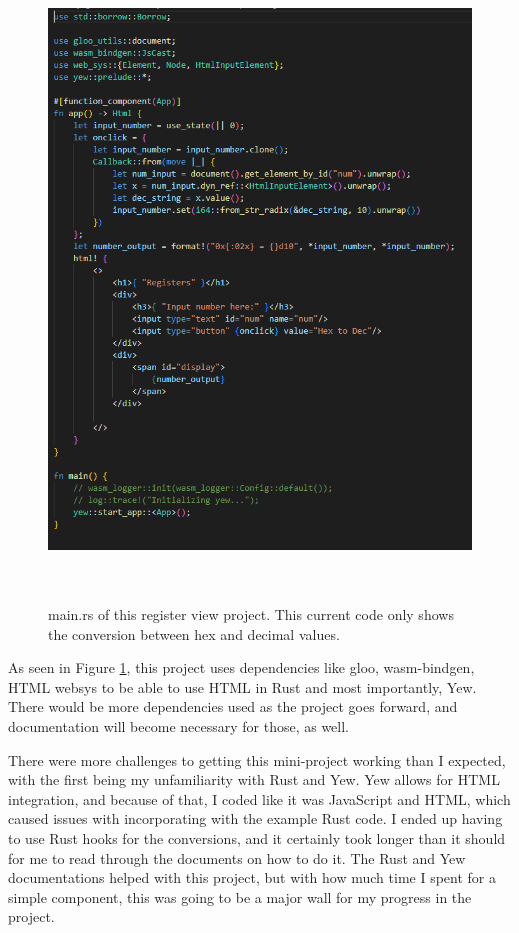 \documentclass[
    paper=letter,
    parskip=half,
    fontsize=12pt,
    titlepage=firstiscover,
    toc=bibliography,
    numbers=endperiod
]{scrartcl}
\begin{document}
\begin{figure}[H]
    \includegraphics[height=17cm]{huy-register-view-project}
    \caption{main.rs of this register view project. This current code only shows the conversion between hex and decimal values.}
    \label{fig:huy-register-view-project}
\end{figure}

As seen in Figure \ref{fig:huy-register-view-project}, this project uses
dependencies like gloo, wasm-bindgen, HTML websys to be able to use HTML
in Rust and most importantly, Yew. There would be more dependencies used
as the project goes forward, and documentation will become necessary for
those, as well.

There were more challenges to getting this mini-project working than I
expected, with the first being my unfamiliarity with Rust and Yew. Yew
allows for HTML integration, and because of that, I coded like it was
JavaScript and HTML, which caused issues with incorporating with the
example Rust code. I ended up having to use Rust hooks for the
conversions, and it certainly took longer than it should for me to read
through the documents on how to do it. The Rust and Yew documentations
helped with this project, but with how much time I spent for a simple
component, this was going to be a major wall for my progress in the
project.
\end{document}
